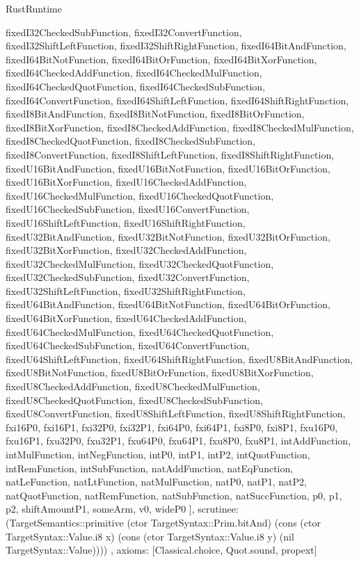 \begin{lexlean}{RustRuntime}
\begin{semanticmodule}
{{      fixedI32CheckedSubFunction,
      fixedI32ConvertFunction,
      fixedI32ShiftLeftFunction,
      fixedI32ShiftRightFunction,
      fixedI64BitAndFunction,
      fixedI64BitNotFunction,
      fixedI64BitOrFunction,
      fixedI64BitXorFunction,
      fixedI64CheckedAddFunction,
      fixedI64CheckedMulFunction,
      fixedI64CheckedQuotFunction,
      fixedI64CheckedSubFunction,
      fixedI64ConvertFunction,
      fixedI64ShiftLeftFunction,
      fixedI64ShiftRightFunction,
      fixedI8BitAndFunction,
      fixedI8BitNotFunction,
      fixedI8BitOrFunction,
      fixedI8BitXorFunction,
      fixedI8CheckedAddFunction,
      fixedI8CheckedMulFunction,
      fixedI8CheckedQuotFunction,
      fixedI8CheckedSubFunction,
      fixedI8ConvertFunction,
      fixedI8ShiftLeftFunction,
      fixedI8ShiftRightFunction,
      fixedU16BitAndFunction,
      fixedU16BitNotFunction,
      fixedU16BitOrFunction,
      fixedU16BitXorFunction,
      fixedU16CheckedAddFunction,
      fixedU16CheckedMulFunction,
      fixedU16CheckedQuotFunction,
      fixedU16CheckedSubFunction,
      fixedU16ConvertFunction,
      fixedU16ShiftLeftFunction,
      fixedU16ShiftRightFunction,
      fixedU32BitAndFunction,
      fixedU32BitNotFunction,
      fixedU32BitOrFunction,
      fixedU32BitXorFunction,
      fixedU32CheckedAddFunction,
      fixedU32CheckedMulFunction,
      fixedU32CheckedQuotFunction,
      fixedU32CheckedSubFunction,
      fixedU32ConvertFunction,
      fixedU32ShiftLeftFunction,
      fixedU32ShiftRightFunction,
      fixedU64BitAndFunction,
      fixedU64BitNotFunction,
      fixedU64BitOrFunction,
      fixedU64BitXorFunction,
      fixedU64CheckedAddFunction,
      fixedU64CheckedMulFunction,
      fixedU64CheckedQuotFunction,
      fixedU64CheckedSubFunction,
      fixedU64ConvertFunction,
      fixedU64ShiftLeftFunction,
      fixedU64ShiftRightFunction,
      fixedU8BitAndFunction,
      fixedU8BitNotFunction,
      fixedU8BitOrFunction,
      fixedU8BitXorFunction,
      fixedU8CheckedAddFunction,
      fixedU8CheckedMulFunction,
      fixedU8CheckedQuotFunction,
      fixedU8CheckedSubFunction,
      fixedU8ConvertFunction,
      fixedU8ShiftLeftFunction,
      fixedU8ShiftRightFunction,
      fxi16P0,
      fxi16P1,
      fxi32P0,
      fxi32P1,
      fxi64P0,
      fxi64P1,
      fxi8P0,
      fxi8P1,
      fxu16P0,
      fxu16P1,
      fxu32P0,
      fxu32P1,
      fxu64P0,
      fxu64P1,
      fxu8P0,
      fxu8P1,
      intAddFunction,
      intMulFunction,
      intNegFunction,
      intP0,
      intP1,
      intP2,
      intQuotFunction,
      intRemFunction,
      intSubFunction,
      natAddFunction,
      natEqFunction,
      natLeFunction,
      natLtFunction,
      natMulFunction,
      natP0,
      natP1,
      natP2,
      natQuotFunction,
      natRemFunction,
      natSubFunction,
      natSuccFunction,
      p0,
      p1,
      p2,
      shiftAmountP1,
      someArm,
      v0,
      wideP0
    ],
    scrutinee: (TargetSemantics::primitive (ctor TargetSyntax::Prim.bitAnd) (cons (ctor TargetSyntax::Value.i8 x) (cons (ctor TargetSyntax::Value.i8 y) (nil TargetSyntax::Value))))
  },
  axioms: [Classical.choice, Quot.sound, propext]
}


\end{semanticmodule}
\end{lexlean}
